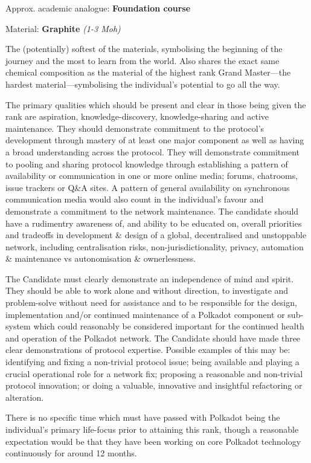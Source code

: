 \documentclass[9pt,oneside]{amsart}
\begin{document}

Approx. academic analogue: \textbf{Foundation course}

Material: \textbf{Graphite} \emph{(1-3 Moh)}

The (potentially) softest of the materials, symbolising the beginning of the journey and the most to learn from the world. Also shares the exact same chemical composition as the material of the highest rank Grand Master---the hardest material---symbolising the individual's potential to go all the way.

The primary qualities which should be present and clear in those being given the rank are aspiration, knowledge-discovery, knowledge-sharing and active maintenance. They should demonstrate commitment to the protocol's development through mastery of at least one major component as well as having a broad understanding across the protocol. They will demonstrate commitment to pooling and sharing protocol knowledge through establishing a pattern of availability or communication in one or more online media; forums, chatrooms, issue trackers or Q\&A sites. A pattern of general availability on synchronous communication media would also count in the individual's favour and demonstrate a commitment to the network maintenance. The candidate should have a rudimentry awareness of, and ability to be educated on, overall priorities and tradeoffs in development \& design of a global, decentralised and unstoppable network, including centralisation risks, non-jurisdictionality, privacy, automation \& maintenance vs autonomisation \& ownerlessness.

The Candidate must clearly demonstrate an independence of mind and spirit. They should be able to work alone and without direction, to investigate and problem-solve without need for assistance and to be responsible for the design, implementation and/or continued maintenance of a Polkadot component or sub-system which could reasonably be considered important for the continued health and operation of the Polkadot network. The Candidate should have made three clear demonstrations of protocol expertise. Possible examples of this may be: identifying and fixing a non-trivial protocol issue; being available and playing a crucial operational role for a network fix; proposing a reasonable and non-trivial protocol innovation; or doing a valuable, innovative and insightful refactoring or alteration.

There is no specific time which must have passed with Polkadot being the individual's primary life-focus prior to attaining this rank, though a reasonable expectation would be that they have been working on core Polkadot technology continuously for around 12 months.
\end{document}
